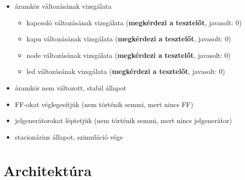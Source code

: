 {\begin{itemize}
\begin{itemize}
\begin{itemize}
\begin{itemize}
	\setlength{\itemindent}{-65pt}%
		\item node bemenetének lekérdezése (\textbf{megkérdezi a tesztelőt}, javasolt: 1)
		\item node értékének kiadása a vezetékekre (\textbf{megkérdezi a tesztelőt}, javasolt: mindkettőre 1)
	\end{itemize}	
	\item led kiértékelése
	\begin{itemize}
	\setlength{\itemsep}{0cm}%
	\setlength{\parskip}{0cm}%
	\setlength{\itemindent}{-65pt}%
		\item led bemenetének lekérdezése (\textbf{megkérdezi a tesztelőt}, javasolt: 1)
	\end{itemize}
\end{itemize}
\item áramkör változásának vizsgálata
\begin{itemize}
\setlength{\itemsep}{0cm}%
\setlength{\parskip}{0cm}%
\setlength{\itemindent}{-50pt}%
	\item kapcsoló változásának vizsgálata (\textbf{megkérdezi a tesztelőt}, javasolt: 0)
	\item kapu változásának vizsgálata (\textbf{megkérdezi a tesztelőt}, javasolt: 0)
	\item node változásának vizsgálata (\textbf{megkérdezi a tesztelőt}, javasolt: 0)
	\item led változásának vizsgálata (\textbf{megkérdezi a tesztelőt}, javasolt: 0)
\end{itemize}
\item áramkör nem változott, stabil állapot
\item FF-okat véglegesítjük (nem történik semmi, mert nincs FF)
\item jelgenerátorokat léptetjük (nem történik semmi, mert nincs jelgenerátor)
\item stacionárius állapot, szimuláció vége
\end{itemize}
\end{itemize}
\vspace{-15pt}}

\section{Architektúra}

